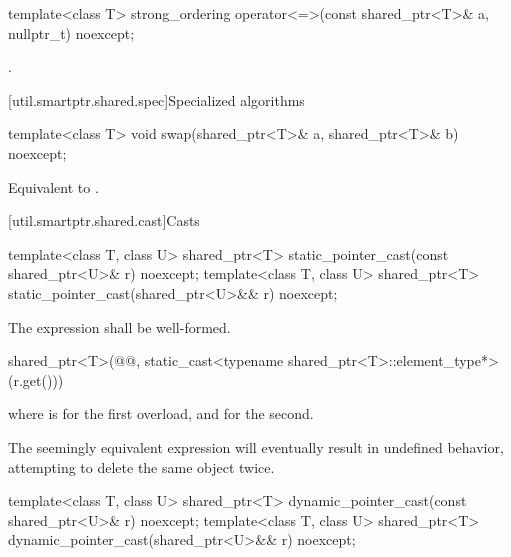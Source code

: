 %
\begin{itemdecl}
template<class T>
  strong_ordering operator<=>(const shared_ptr<T>& a, nullptr_t) noexcept;
\end{itemdecl}

\begin{itemdescr}
\pnum
\returns
{}.
\end{itemdescr}

[util.smartptr.shared.spec]{Specialized algorithms}

%
\begin{itemdecl}
template<class T>
  void swap(shared_ptr<T>& a, shared_ptr<T>& b) noexcept;
\end{itemdecl}

\begin{itemdescr}
\pnum
\effects
Equivalent to .
\end{itemdescr}

[util.smartptr.shared.cast]{Casts}

%
\begin{itemdecl}
template<class T, class U>
  shared_ptr<T> static_pointer_cast(const shared_ptr<U>& r) noexcept;
template<class T, class U>
  shared_ptr<T> static_pointer_cast(shared_ptr<U>&& r) noexcept;
\end{itemdecl}

\begin{itemdescr}
\pnum
\requires The expression  shall
be well-formed.

\pnum
\returns
\begin{codeblock}
shared_ptr<T>(@@, static_cast<typename shared_ptr<T>::element_type*>(r.get()))
\end{codeblock}
where  is  for the first overload, and
 for the second.

\pnum
\begin{note}
The seemingly equivalent expression
will eventually result in undefined behavior, attempting to delete the
same object twice.
\end{note}
\end{itemdescr}

%
\begin{itemdecl}
template<class T, class U>
  shared_ptr<T> dynamic_pointer_cast(const shared_ptr<U>& r) noexcept;
template<class T, class U>
  shared_ptr<T> dynamic_pointer_cast(shared_ptr<U>&& r) noexcept;
\end{itemdecl}

